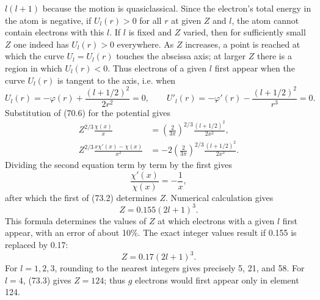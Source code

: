 $l(l+1)$ because the motion is quasiclassical. Since the electron's total energy in the atom is negative, if $U_l(r)>0$ for all $r$ at given $Z$ and $l$, the atom cannot contain electrons with this $l$. If $l$ is fixed and $Z$ varied, then for sufficiently small $Z$ one indeed has $U_l(r)>0$ everywhere. As $Z$ increases, a point is reached at which the curve $U_l=U_l(r)$ touches the abscissa axis; at larger $Z$ there is a region in which $U_l(r)<0$. Thus electrons of a given $l$ first appear when the curve $U_l(r)$ is tangent to the axis, i.e. when
\[
 U_l(r)=-\varphi(r)+\frac{(l+1/2)^2}{2r^2}=0,
 \qquad U'_l(r)=-\varphi'(r)-\frac{(l+1/2)^2}{r^3}=0.
\]
Substitution of (70.6) for the potential gives
\begin{equation}
\begin{split}
 Z^{2/3}\frac{\chi(x)}x&=\left(\frac2{3\pi}\right)^{2/3}\frac{(l+1/2)^2}{2x^2},\\
 Z^{2/3}\frac{x\chi'(x)-\chi(x)}{x^2}&=-2\left(\frac2{3\pi}\right)^{2/3}\frac{(l+1/2)^2}{2x^3}.
\end{split}
\tag{73.2}
\end{equation}
Dividing the second equation term by term by the first gives
\[
 \frac{\chi'(x)}{\chi(x)}=-\frac1x,
\]
after which the first of (73.2) determines $Z$. Numerical calculation gives
\[
 Z=0.155(2l+1)^3.
\]
This formula determines the values of $Z$ at which electrons with a given $l$ first appear, with an error of about 10\%. The exact integer values result if 0.155 is replaced by 0.17:
\begin{equation}
 Z=0.17(2l+1)^3.
 \tag{73.3}
\end{equation}
For $l=1,2,3$, rounding to the nearest integers gives precisely 5, 21, and 58. For $l=4$, (73.3) gives $Z=124$; thus $g$ electrons would first appear only in element 124.
